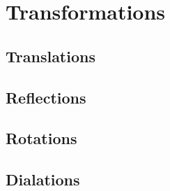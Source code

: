\documentclass{book}
\begin{document}
\section{Transformations}
\subsection{Translations}

\subsection{Reflections}

\subsection{Rotations}

\subsection{Dialations}

\end{document}
